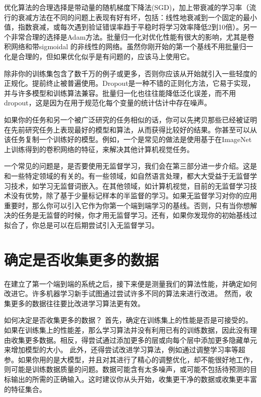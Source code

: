 优化算法的合理选择是带动量的随机梯度下降法(SGD)，加上带衰减的学习率（流行的衰减方法在不同的问题上表现有好有坏，包括：线性地衰减到一个固定的最小值，指数衰减，或每次遇到验证错误率趋于平稳时将学习效率降低2到10倍）。另一个非常合理的选择是Adam方法。批量归一化对优化性能有很大的影响，尤其是卷积网络和带sigmoidal 的非线性的网络。虽然你刚开始的第一个基线不用批量归一化是合理的，但如果优化似乎是有问题的，应该马上使用它。

除非你的训练集包含了数千万的例子或更多，否则你应该从开始就引入一些轻度的正规化。提前终止被普遍使用。Dropout是一种不错的正则化方法，它易于实现，并与许多模型和训练算法兼容。批量归一化也往往能降低泛化误差，而不用dropout，这是因为在用于规范化每个变量的统计估计中存在噪声。 

如果你的任务和另一个被广泛研究的任务相似的话，你可以先拷贝那些已经被证明在先前研究任务上表现最好的模型和算法，从而获得比较好的结果。你甚至可以从该任务复制一个训练好的模型。例如，一个是常见的做法是使用基于在ImageNet上训练得到的卷积网络的特征，来解决其他计算机视觉任务。

一个常见的问题是，是否要使用无监督学习，我们会在第三部分进一步介绍。这是和一些特定领域的有关的。有一些领域，如自然语言处理，都大大受益于无监督学习技术，如学习无监督词嵌入。在其他领域，如计算机视觉，目前的无监督学习技术没有优势，除了基于少量标记样本的半监督的学习。如果无监督学习对你的应用重要时，那么你可以引入它作为你第一个端到端学习的基线。否则，只有当你想解决的任务是无监督的时候，你才用无监督学习。还有，如果你发现你的初始基线过拟合了，你总是可以在后期尝试引入无监督学习。


\section{确定是否收集更多的数据}
\label{sec:11.3}

在建立了第一个端到端的系统之后，接下来便是测量我们的算法性能，并确定如何改进它。许多机器学习新手试图通过尝试许多不同的算法来进行改进。 然而，收集更多的数据往往要比改进学习算法更有效。

如何决定是否收集更多的数据？ 首先，确定在训练集上的性能是否是可接受的。如果在训练集上的性能差，那么学习算法并没有利用已有的训练数据，因此没有理由收集更多数据。相反，得尝试通过添加更多的层或向每个层中添加更多隐藏单元来增加模型的大小。 此外，还得尝试改进学习算法，例如通过调整学习率等超参。如果你用的是大模型，并且对其进行了精心的调整优化，却不能很好地工作，则可能是训练数据质量的问题。数据可能含有太多噪声，或可能不包括待预测的目标输出的所需的正确输入。这时建议你从头开始，收集更干净的数据或收集更丰富的特征集合。

